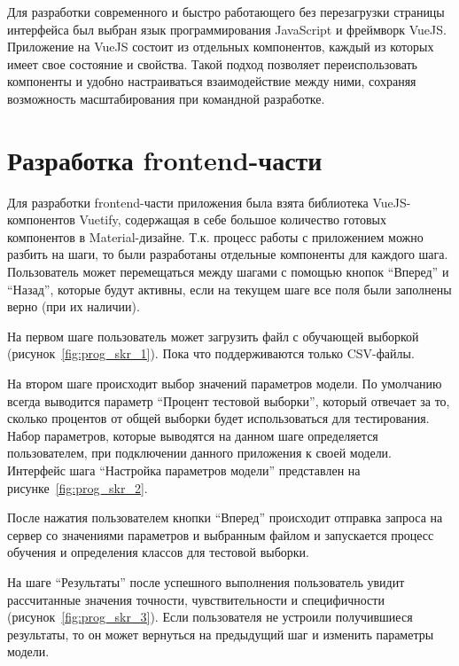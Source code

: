 Для разработки современного и быстро работающего без перезагрузки страницы интерфейса был выбран язык программирования JavaScript и фреймворк VueJS. Приложение на VueJS состоит из отдельных компонентов, каждый из которых имеет свое состояние и свойства. Такой подход позволяет переиспользовать компоненты и удобно настраиваться взаимодействие между ними, сохраняя возможность масштабирования при командной разработке.

\section{Разработка frontend-части}

Для разработки frontend-части приложения была взята библиотека VueJS-компонентов Vuetify, содержащая в себе большое количество готовых компонентов в Material-дизайне. Т.к. процесс работы с приложением можно разбить на шаги, то были разработаны отдельные компоненты для каждого шага. Пользователь может перемещаться между шагами с помощью кнопок “Вперед” и “Назад”, которые будут активны, если на текущем шаге все поля были заполнены верно (при их наличии).


На первом шаге пользователь может загрузить файл с обучающей выборкой (рисунок~\ref{fig:prog_skr_1}). Пока что поддерживаются только CSV-файлы.




На втором шаге происходит выбор значений параметров модели. По умолчанию всегда выводится параметр “Процент тестовой выборки”, который отвечает за то, сколько процентов от общей выборки будет использоваться для тестирования. Набор параметров, которые выводятся на данном шаге определяется пользователем, при подключении данного приложения к своей модели. Интерфейс шага “Настройка параметров модели” представлен на рисунке~\ref{fig:prog_skr_2}.




После нажатия пользователем кнопки “Вперед” происходит отправка запроса на сервер со значениями параметров и выбранным файлом и запускается процесс обучения и определения классов для тестовой выборки.


На шаге “Результаты” после успешного выполнения пользователь увидит рассчитанные значения точности, чувствительности и специфичности (рисунок~\ref{fig:prog_skr_3}). Если пользователя не устроили получившиеся результаты, то он может вернуться на предыдущий шаг и изменить параметры модели.


